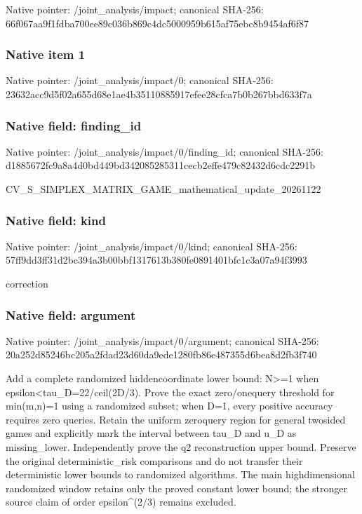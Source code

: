 \documentclass[10pt,a4paper]{article}
\begin{document}
Native pointer: /joint\_analysis/impact; canonical SHA-256: 66f067aa9f1fdba700ee89c0\allowbreak{}36b869c4dc5000959b615af7\allowbreak{}5ebc8b9454af6f87



\subsubsection{Native item 1}


Native pointer: /joint\_analysis/impact/0; canonical SHA-256: 23632acc9d5f02a655d68e1a\allowbreak{}e4b35110885917efee28cfca\allowbreak{}7b0b267bbd633f7a



\subsubsection{Native field: finding\_id}


Native pointer: /joint\_analysis/impact/0/finding\_id; canonical SHA-256: d1885672fc9a8a4d0bd449bd\allowbreak{}342085285311cecb2effe479\allowbreak{}c82432d6cdc2291b


CV\_S\_SIMPLEX\_MATRIX\_GAME\allowbreak{}\_mathematical\_update\_202\allowbreak{}61122


\subsubsection{Native field: kind}


Native pointer: /joint\_analysis/impact/0/kind; canonical SHA-256: 57ff9dd3ff31d2bc394a3b00\allowbreak{}bbf1317613b380fe0891401b\allowbreak{}fc1c3a07a94f3993


correction


\subsubsection{Native field: argument}


Native pointer: /joint\_analysis/impact/0/argument; canonical SHA-256: 20a252d85246bc205a2fdad2\allowbreak{}3d60da9ede1280fb86e48735\allowbreak{}5d6bea8d2fb3f740


Add a complete randomized hiddencoordinate lower bound: N>=1 when epsilon<tau\_D=22/ceil(2D/3). Prove the exact zero/onequery threshold for min(m,n)=1 using a randomized subset; when D=1, every positive accuracy requires zero queries. Retain the uniform zeroquery region for general twosided games and explicitly mark the interval between tau\_D and u\_D as missing\_lower. Independently prove the q2 reconstruction upper bound. Preserve the original deterministic\_risk comparisons and do not transfer their deterministic lower bounds to randomized algorithms. The main highdimensional randomized window retains only the proved constant lower bound; the stronger source claim of order epsilon\textasciicircum{}(2/3) remains excluded.
\end{document}
